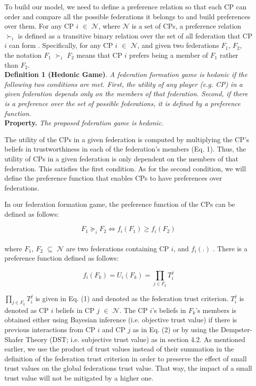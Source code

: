 \documentclass[preprint]{elsarticle}
\theoremstyle{definition}
\theoremstyle{remark}
\theoremstyle{property}
\begin{document}
To build our model, we need to define a preference relation so that each
CP can order and compare all the possible federations it
belongs to and build preferences over them. For any CP $i$ $\in$ $\mathcal{N}$, where $\mathcal{N}$ is a set of
CPs, a preference relation $\succ_{i}$ is defined as a transitive
binary relation over the set of all federation that CP $i$ can
form \cite{bogomolnaia2002stability}. Specifically, for any CP $i$ $\in$ $\mathcal{N}$, and given two federations $F_{1}$, $F_{2}$, the notation $F_{1}$ $\succ_{i}$ $F_{2}$ means that CP $i$ prefers being a member of $F_{1}$ rather than $F_{2}$. \\

\textbf{Definition 1 (Hedonic Game)}.\emph{ A federation formation game is hedonic if the following two conditions are met. First, the utility of any player (e.g. CP) in a given federation depends only on the members of that federation. Second, if there is a preference over the set of possible federations, it is defined by a preference function.} \\

\textbf{Property.} \emph{The proposed federation game is hedonic.}

The utility of the CPs in a given federation is
computed by multiplying the CP’s beliefs in trustworthiness in
each of the federation’s members (Eq. 1). Thus, the utility of CPs
in a given federation is only dependent on the members of that
federation. This satisfies the first condition. As for the second condition,
we will define the preference function that enables CPs to have preferences over federations.

In our federation formation game, the preference
function of the CPs can be defined as follows:

\begin{equation}
F_{1} \succeq_{i} F_{2} \Longleftrightarrow f_{i}(F_{1}) \geq f_{i}(F_{2})
\end{equation} \\

where $F_{1}$, $F_{2}$ $\subseteq$ $\mathcal{N}$ are two federations containing CP $i$, and
$f_{i}(.)$ . There is a preference function defined as follows:

\begin{equation}
f_{i}(F_{k}) = U_{i}(F_{k}) = \prod _{j\in F_{k}} T_{i}^{j}
\end{equation}

$\prod _{j\in F_{k}} T_{i}^{j}$ is given in Eq. (1) and denoted as the federation trust criterion. $T_{i}^{j}$ is denoted as CP $i$ beliefs in CP $j$ $\in$ $\mathcal{N}$. The CP $i$'s beliefs in $F_{k}$'s members is obtained either using Bayesian inference (i.e. objective trust value) if there is previous interactions from CP $i$ and CP $j$ as in Eq. (2) or by using the Dempster-Shafer Theory (DST; i.e. subjective trust value) as in section 4.2. As mentioned earlier, we use
the product of trust values instead of their summation in the definition of the federation trust criterion in order to preserve the effect of small trust values on the global federations trust value. That way, the impact of a small trust value will not be mitigated by a higher one.
\end{document}
